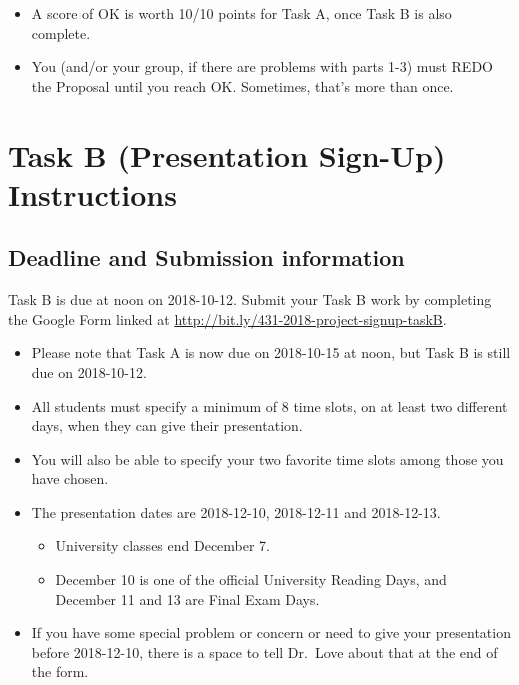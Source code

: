 \documentclass[]{book}
\providecommand{\tightlist}{%
  \setlength{\itemsep}{0pt}\setlength{\parskip}{0pt}}
\theoremstyle{definition}
\theoremstyle{definition}
\theoremstyle{definition}
\theoremstyle{remark}
\begin{document}
\begin{itemize}
\tightlist
\item
  A score of OK is worth 10/10 points for Task A, once Task B is also
  complete.
\item
  You (and/or your group, if there are problems with parts 1-3) must
  REDO the Proposal until you reach OK. Sometimes, that's more than
  once.
\end{itemize}

\hypertarget{taskB}{%
\chapter{Task B (Presentation Sign-Up) Instructions}\label{taskB}}

\hypertarget{deadline-and-submission-information-1}{%
\section{Deadline and Submission
information}\label{deadline-and-submission-information-1}}

Task B is due at noon on 2018-10-12. Submit your Task B work by
completing the Google Form linked at
\url{http://bit.ly/431-2018-project-signup-taskB}.

\begin{itemize}
\item
  Please note that Task A is now due on 2018-10-15 at noon, but Task B
  is still due on 2018-10-12.
\item
  All students must specify a minimum of 8 time slots, on at least two
  different days, when they can give their presentation.
\item
  You will also be able to specify your two favorite time slots among
  those you have chosen.
\item
  The presentation dates are 2018-12-10, 2018-12-11 and 2018-12-13.

  \begin{itemize}
  \tightlist
  \item
    University classes end December 7.
  \item
    December 10 is one of the official University Reading Days, and
    December 11 and 13 are Final Exam Days.
  \end{itemize}
\item
  If you have some special problem or concern or need to give your
  presentation before 2018-12-10, there is a space to tell Dr.~Love
  about that at the end of the form.
\end{itemize}
\end{document}
